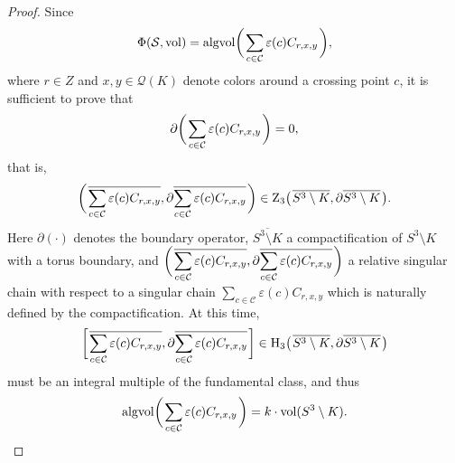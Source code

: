 \documentclass[12pt]{amsart}
\theoremstyle{definition}
\begin{document}
\begin{proof}
Since 
\[
 \Phi(\mathcal{S}, \mathrm{vol}) = \mathrm{algvol} \biggl( \hskip 0.1em \sum_{c \in \mathcal{C}} \varepsilon(c) C_{r, x, y} \hskip 0.1em \biggr),
\]
where $r \in Z$ and $x, y \in \mathcal{Q}(K)$ denote colors around a crossing point $c$, it is sufficient to prove that
\[
 \partial \biggl( \hskip 0.1em \sum_{c \in \mathcal{C}} \varepsilon(c) C_{r, x, y} \hskip 0.1em \biggr) = 0,
\]
that is,
\[
 \biggl( \hskip 0.1em \overline{\sum_{c \in \mathcal{C}} \varepsilon(c) C_{r, x, y}}, \partial \overline{\sum_{c \in \mathcal{C}} \varepsilon(c) C_{r, x, y}} \hskip 0.1em \biggr) \in \mathrm{Z}_{3} \bigl( \hskip 0.1em \overline{S^{3} \setminus K}, \partial \overline{S^{3} \setminus K} \hskip 0.1em \bigr).
\]
Here $\partial(\cdot)$ denotes the boundary operator, $\overline{S^{3} \setminus K}$ a compactification of $S^{3} \setminus K$ with a torus boundary, and $\displaystyle \biggl( \hskip 0.1em \overline{\sum_{c \in \mathcal{C}} \varepsilon(c) C_{r, x, y}}, \partial \overline{\sum_{c \in \mathcal{C}} \varepsilon(c) C_{r, x, y}} \hskip 0.1em \biggr)$ a relative singular chain with respect to a singular chain $\displaystyle \sum_{c \in \mathcal{C}} \varepsilon(c) C_{r, x, y}$ which is naturally defined by the compactification.
At this time,
\[
 \biggl[ \hskip 0.1em \overline{\sum_{c \in \mathcal{C}} \varepsilon(c) C_{r, x, y}}, \partial \overline{\sum_{c \in \mathcal{C}} \varepsilon(c) C_{r, x, y}} \hskip 0.1em \biggr] \in \mathrm{H}_{3} \bigl( \hskip 0.1em \overline{S^{3} \setminus K}, \partial \overline{S^{3} \setminus K} \hskip 0.1em \bigr)
\]
must be an integral multiple of the fundamental class, and thus
\[
 \mathrm{algvol} \biggl( \hskip 0.1em \sum_{c \in \mathcal{C}} \varepsilon(c) C_{r, x, y} \hskip 0.1em \biggr) = k \cdot \mathrm{vol}(S^{3} \setminus K).
\]


\end{proof}
\end{document}
